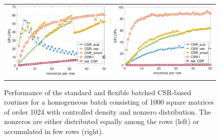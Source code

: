 \begin{figure}
	\begin{center}
		\begin{tabular}{cc}
			\includegraphics[width=.45\columnwidth]{plots/INCDENSITY_GFLOPS}
			&
			\includegraphics[width=.458\columnwidth]{plots/INC_GFLOPS}\\
		\end{tabular}
	\end{center}
	\caption{Performance of the standard and flexible batched CSR-based \spmv 
		routines for a homogeneous batch consisting of 1000 square matrices of 
		order 
		1024 with controlled density and nonzero distribution. 
		The nonzeros are either distributed equally among the rows (left) or 
		accumulated in few rows (right).}
	\label{2017-batched-spmv:fig:incdensity}
\end{figure}


